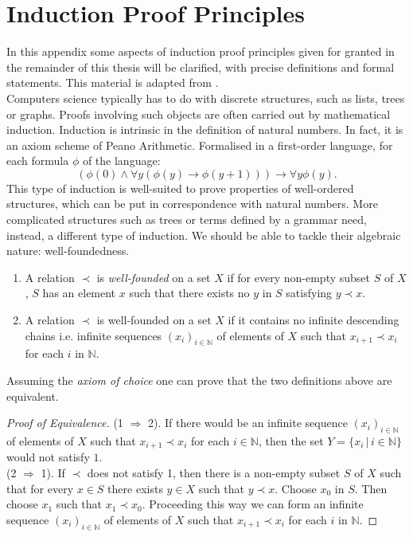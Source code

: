 \chapter{Induction Proof Principles}
In this appendix some aspects of induction proof principles given for granted in the remainder of this thesis will be clarified, with precise definitions and formal statements. This material is adapted from \cite{hrbacek_introduction_1999}.\\
Computers science typically has to do with discrete structures, such as lists, trees or graphs. Proofs involving such objects are often carried out by mathematical induction. Induction is intrinsic in the definition of natural numbers. In fact, it is an axiom scheme of Peano Arithmetic. Formalised in a first-order language, for each formula $\phi$ of the language:
$$
(\phi(0)\land\forall y (\phi(y)\rightarrow\phi(y+1)))\rightarrow\forall y\phi(y).
$$
This type of induction is well-suited to prove properties of well-ordered structures, which can be put in correspondence with natural numbers. More complicated structures such as trees or terms defined by a grammar need, instead, a different type of induction. We should be able to tackle their algebraic nature: well-foundedness.
\begin{definition}\hfill
	\begin{enumerate}
	\item A relation $\prec$ is \emph{well-founded} on a set $X$ if for every non-empty subset $S$ of $X$, $S$ has an  element $x$ such that there exists no $y$ in $S$ satisfying $y\prec x$.
	\item A relation $\prec$ is well-founded on a set $X$ if it contains no infinite descending chains i.e. infinite sequences $(x_i)_{i\in\mathbb{N}}$ of elements of $X$ such that $x_{i+1}\prec x_i$ for each $i$ in $\mathbb{N}$.
	\end{enumerate}
\end{definition}
Assuming the \emph{axiom of choice} one can prove that the two definitions above are equivalent.
\begin{proof}[Proof of Equivalence]
	(1 $\Rightarrow$ 2). If there would be an infinite sequence $(x_i)_{i\in\mathbb{N}}$ of elements of $X$ such that $x_{i+1}\prec x_i$ for each $i\in\mathbb{N}$, then the set $Y=\{x_i\,|\,i\in\mathbb{N}\}$ would not satisfy $1$.\\
	(2 $\Rightarrow$ 1). If $\prec$ does not satisfy 1, then there is a non-empty subset $S$ of $X$ such that for every $x\in S$ there exists $y\in X$ such that $y\prec x$. Choose $x_0$ in $S$. Then choose $x_1$ such that $x_1\prec x_0$. Proceeding this way we can form an infinite sequence $(x_i)_{i\in\mathbb{N}}$ of elements of $X$ such that $x_{i+1}\prec x_i$ for each $i$ in $\mathbb{N}$.
\end{proof}
